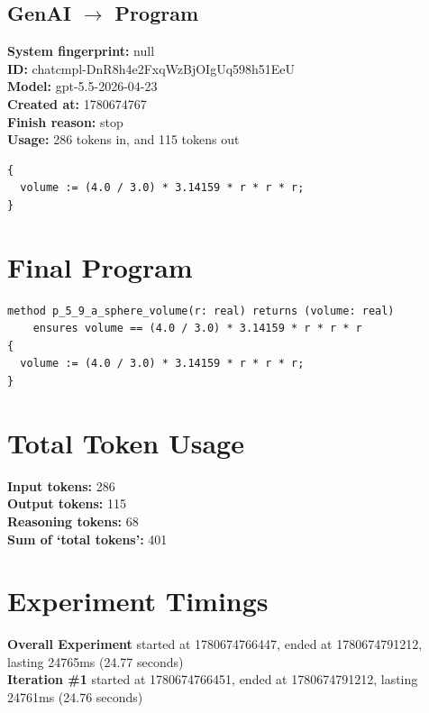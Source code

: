 \documentclass{article}
\begin{document}
\subsection*{GenAI $\rightarrow$ Program}
\textbf{System fingerprint: }null
\\\textbf{ID: }chatcmpl-DnR8h4e2FxqWzBjOIgUq598h51EeU
\\\textbf{Model: }gpt-5.5-2026-04-23
\\\textbf{Created at: }1780674767
\\\textbf{Finish reason: }stop
\\\textbf{Usage: }286 tokens in, and 115 tokens out
\begin{lstlisting}
{
  volume := (4.0 / 3.0) * 3.14159 * r * r * r;
}
\end{lstlisting}
\section*{Final Program}
\begin{lstlisting}
method p_5_9_a_sphere_volume(r: real) returns (volume: real)
	ensures volume == (4.0 / 3.0) * 3.14159 * r * r * r
{
  volume := (4.0 / 3.0) * 3.14159 * r * r * r;
}
\end{lstlisting}
\section*{Total Token Usage}
\textbf{Input tokens: }286
\\\textbf{Output tokens: }115
\\\textbf{Reasoning tokens: }68
\\\textbf{Sum of `total tokens': }401
\section*{Experiment Timings}
\textbf{Overall Experiment} started at 1780674766447, ended at 1780674791212, lasting 24765ms (24.77 seconds)
\\\textbf{Iteration \#1} started at 1780674766451, ended at 1780674791212, lasting 24761ms (24.76 seconds)
\end{document}
